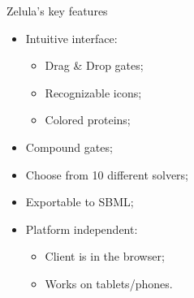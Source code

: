 \documentclass[utf8x,outline]{beamer}
\begin{document}
{
	\begin{frame}{Zelula's key features}
		\begin{itemize}
			\item Intuitive interface:
			\begin{itemize}
				\item Drag \& Drop gates;
				\item Recognizable icons;
				\item Colored proteins;
			\end{itemize}
			\item Compound gates;
			\item Choose from 10 different solvers;
			\item Exportable to SBML;
			\item Platform independent:
			\begin{itemize}
				\item Client is in the browser;
				\item Works on tablets/phones.
			\end{itemize}
		\end{itemize}
	\end{frame}
}
\end{document}
